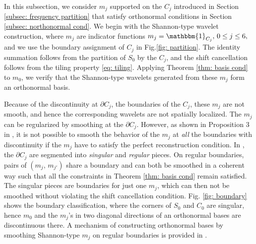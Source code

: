 In this subsection, we consider $m_j$ supported on the $C_j$ introduced in Section \ref{subsec: frequency partition} that satisfy orthonormal conditions in Section \ref{subsec: northonormal cond}. We begin with the Shannon-type wavelet construction,
where $m_j$ are indicator functions $ m_j = \mathbbm{1}_{C_j},\,0\leq j \leq 6,\,$ and we use the boundary assignment of $C_j$ in Fig.\ref{fig: partition}.
The identity summation follows from the partition of $S_0$ by the $C_j$, and the shift cancellation follows from the tiling property \eqref{eq: tiling}. %
Applying Theorem \ref{thm: basis cond} to $m_0$, we verify that the Shannon-type wavelets generated from these $m_j$ form an orthonormal basis.

Because of the discontinuity at $\partial C_j$, the boundaries of the $C_j$, these $m_j$ are not smooth, and hence the corresponding wavelets are not spatially localized. The $m_j$ can be regularized by smoothing at the $\partial C_j$.
However, as shown in Proposition 3 in \cite{durand2007}, it is not possible to smooth the behavior of the $m_j$ at  {\it all} the boundaries with discontinuity if the $m_j$ have to satisfy the perfect reconstruction condition.
In \cite{yin2014orthshear}, the $\partial C_j$ are segmented into {\it singular} and {\it regular} pieces. On regular boundaries, pairs of $(m_j,\, m_{j'})$ share a boundary and can both be smoothed in a coherent way such that all the constraints in Theorem \ref{thm: basis cond} remain satisfied. The singular pieces are boundaries for just one $m_j$, which can then not be smoothed without violating the shift cancellation condition. Fig. \ref{fig: boundary} shows the boundary classification, where the corners of $S_0$ and $C_0$ are singular, hence $m_0$ and the $m_j$'s in two diagonal directions of an orthonormal bases are discontinuous there. A mechanism of constructing orthonormal bases by smoothing Shannon-type $m_j$ on regular boundaries is provided in \cite{yin2014orthshear}.%

